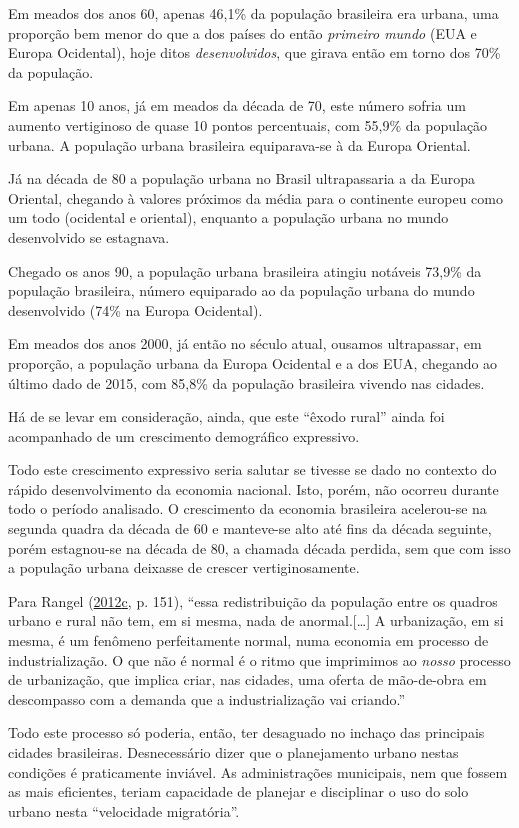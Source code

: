 \documentclass[a4paper, 12pt]{article}
\begin{document}
Em meados dos anos 60, apenas 46,1\% da população brasileira era urbana,
uma proporção bem menor do que a dos países do então \emph{primeiro
mundo} (EUA e Europa Ocidental), hoje ditos \emph{desenvolvidos}, que
girava então em torno dos 70\% da população.

Em apenas 10 anos, já em meados da década de 70, este número sofria um
aumento vertiginoso de quase 10 pontos percentuais, com 55,9\% da
população urbana. A população urbana brasileira equiparava-se à da
Europa Oriental.

Já na década de 80 a população urbana no Brasil ultrapassaria a da
Europa Oriental, chegando à valores próximos da média para o continente
europeu como um todo (ocidental e oriental), enquanto a população urbana
no mundo desenvolvido se estagnava.

Chegado os anos 90, a população urbana brasileira atingiu notáveis
73,9\% da população brasileira, número equiparado ao da população urbana
do mundo desenvolvido (74\% na Europa Ocidental).

Em meados dos anos 2000, já então no século atual, ousamos ultrapassar,
em proporção, a população urbana da Europa Ocidental e a dos EUA,
chegando ao último dado de 2015, com 85,8\% da população brasileira
vivendo nas cidades.

Há de se levar em consideração, ainda, que este ``êxodo rural'' ainda
foi acompanhado de um crescimento demográfico expressivo.

Todo este crescimento expressivo seria salutar se tivesse se dado no
contexto do rápido desenvolvimento da economia nacional. Isto, porém,
não ocorreu durante todo o período analisado. O crescimento da economia
brasileira acelerou-se na segunda quadra da década de 60 e manteve-se
alto até fins da década seguinte, porém estagnou-se na década de 80, a
chamada década perdida, sem que com isso a população urbana deixasse de
crescer vertiginosamente.

Para Rangel
(\protect\hyperlink{ref-rangel1986a}{2012}\protect\hyperlink{ref-rangel1986a}{c},
p. 151), ``essa redistribuição da população entre os quadros urbano e
rural não tem, em si mesma, nada de anormal.{[}\ldots{}{]} A
urbanização, em si mesma, é um fenômeno perfeitamente normal, numa
economia em processo de industrialização. O que não é normal é o ritmo
que imprimimos ao \emph{nosso} processo de urbanização, que implica
criar, nas cidades, uma oferta de mão-de-obra em descompasso com a
demanda que a industrialização vai criando.''

Todo este processo só poderia, então, ter desaguado no inchaço das
principais cidades brasileiras. Desnecessário dizer que o planejamento
urbano nestas condições é praticamente inviável. As administrações
municipais, nem que fossem as mais eficientes, teriam capacidade de
planejar e disciplinar o uso do solo urbano nesta ``velocidade
migratória''.
\end{document}
